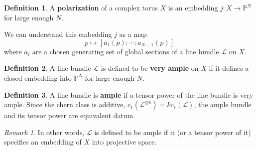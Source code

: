\documentclass[12pt,reqno]{amsart}
\newcommand{\mc}{\mathcal}
\renewcommand{\P}{\mathbb{P}}
\theoremstyle{definition}
\newtheorem{defn}{Definition}
\theoremstyle{remark}
\newtheorem*{remark}{Remark}
\begin{document}
\begin{defn} A \textbf{polarization} of a complex torus $X$ is an embedding $j: X \to \P^N$ for large enough $N$. \end{defn}



We can understand this embedding $j$ as a map $$p \mapsto [a_1(p) : \cdots : a_{N-1}(p)]$$ where $a_i$ are a chosen generating set of global sections of a line bundle $\mc{L}$ on $X$. 


\begin{defn} A line bundle $\mc{L}$ is defined to be \textbf{very ample} on $X$ if it defines a closed embedding into $\P^N$ for large enough $N$. %
\end{defn}

\begin{defn} A line bundle is \textbf{ample} if a tensor power of the line bundle is very ample. Since the chern class is additive, $c_1(\mc{L}^{\otimes k}) = kc_1(\mc{L})$, the ample bundle and its tensor power are equivalent datum. \end{defn} 

\begin{remark} In other words, $\mc{L}$ is defined to be ample if it (or a tensor power of it) specifies an embedding of $X$ into projective space.\end{remark}


\end{document}
